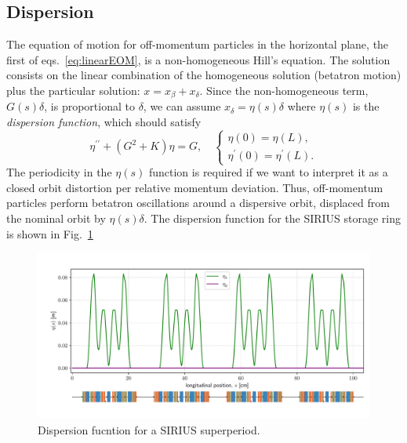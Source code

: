 \subsection{Dispersion}
The equation of motion for off-momentum particles in the horizontal plane, the first of eqs.~\eqref{eq:linearEOM}, is a non-homogeneous Hill's equation. The solution consists on the linear combination of the homogeneous solution (betatron motion)  plus the particular solution: $x=x_\beta+ x_\delta$. Since the non-homogeneous term, $G(s)\delta$, is proportional to $\delta$, we can assume  $x_{\delta} = \eta(s)\delta$ where $\eta(s)$ is the \textit{dispersion function}, which should satisfy
    \begin{equation*}
        \eta^{\prime\prime}+(G^2+K)\eta=G,\quad
        \begin{cases}
            \eta(0) = \eta(L),\\
            \eta^\prime(0) = \eta^\prime(L).
        \end{cases}
    \end{equation*}
    The periodicity in the $\eta(s)$ function is required if we want to interpret it as a closed orbit distortion per relative momentum deviation. Thus, off-momentum particles perform betatron oscillations around a dispersive orbit, displaced from the nominal orbit by $\eta(s)\delta$. The dispersion function for the SIRIUS storage ring is shown in Fig.~\ref{dispersion_func}
    \begin{figure}[htb]
        \centering
        \includegraphics[width=\textwidth]{Images/dispersion.pdf}
        \caption[Dispersion function for a SIRIUS superperiod.]{Dispersion fucntion for a SIRIUS superperiod.}
        \label{dispersion_func}
    \end{figure}
